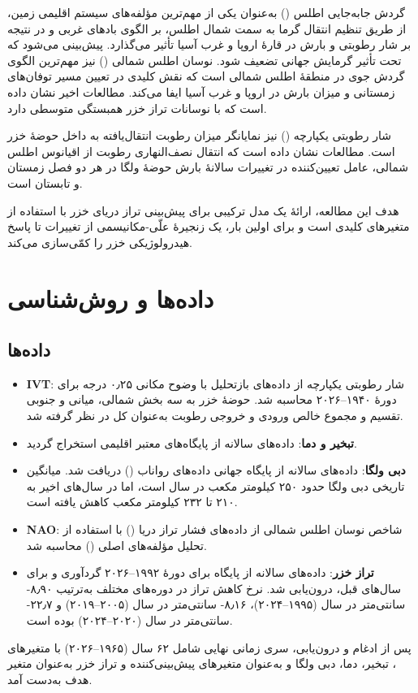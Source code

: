 \documentclass[12pt,a4paper]{article}
\begin{document}
گردش جابه‌جایی اطلس () به‌عنوان یکی از مهم‌ترین مؤلفه‌های سیستم اقلیمی زمین، از طریق تنظیم انتقال گرما به سمت شمال اطلس، بر الگوی بادهای غربی و در نتیجه بر شار رطوبتی و بارش در قارهٔ اروپا و غرب آسیا تأثیر می‌گذارد. پیش‌بینی می‌شود که  تحت تأثیر گرمایش جهانی تضعیف شود. نوسان اطلس شمالی () نیز مهم‌ترین الگوی گردش جوی در منطقهٔ اطلس شمالی است که نقش کلیدی در تعیین مسیر توفان‌های زمستانی و میزان بارش در اروپا و غرب آسیا ایفا می‌کند. مطالعات اخیر نشان داده است که  با نوسانات تراز خزر همبستگی متوسطی دارد.

شار رطوبتی یکپارچه () نیز نمایانگر میزان رطوبت انتقال‌یافته به داخل حوضهٔ خزر است. مطالعات نشان داده است که انتقال نصف‌النهاری رطوبت از اقیانوس اطلس شمالی، عامل تعیین‌کننده در تغییرات سالانهٔ بارش حوضهٔ ولگا در هر دو فصل زمستان و تابستان است.

هدف این مطالعه، ارائهٔ یک مدل ترکیبی برای پیش‌بینی تراز دریای خزر با استفاده از متغیرهای کلیدی است و برای اولین بار، یک زنجیرهٔ علّی-مکانیسمی از تغییرات  تا پاسخ هیدرولوژیکی خزر را کمّی‌سازی می‌کند.

\section{داده‌ها و روش‌شناسی}
\subsection{داده‌ها}
\begin{itemize}
\item \textbf{IVT}: شار رطوبتی یکپارچه از داده‌های بازتحلیل  با وضوح مکانی ۰٫۲۵ درجه برای دورهٔ ۱۹۴۰–۲۰۲۶ محاسبه شد. حوضهٔ خزر به سه بخش شمالی، میانی و جنوبی تقسیم و مجموع خالص ورودی و خروجی رطوبت به‌عنوان  کل در نظر گرفته شد.
\item \textbf{تبخیر و دما}: داده‌های سالانه از پایگاه‌های معتبر اقلیمی استخراج گردید.
\item \textbf{دبی ولگا}: داده‌های سالانه از پایگاه جهانی داده‌های رواناب () دریافت شد. میانگین تاریخی دبی ولگا حدود ۲۵۰ کیلومتر مکعب در سال است، اما در سال‌های اخیر به ۲۱۰ تا ۲۳۲ کیلومتر مکعب کاهش یافته است.
\item \textbf{NAO}: شاخص نوسان اطلس شمالی از داده‌های فشار تراز دریا () با استفاده از تحلیل مؤلفه‌های اصلی () محاسبه شد.
\item \textbf{تراز خزر}: داده‌های سالانه از پایگاه  برای دورهٔ ۱۹۹۲–۲۰۲۶ گردآوری و برای سال‌های قبل، درون‌یابی شد. نرخ کاهش تراز در دوره‌های مختلف به‌ترتیب ۸٫۹۰- سانتی‌متر در سال (۱۹۹۵–۲۰۲۴)، ۸٫۱۶- سانتی‌متر در سال (۲۰۰۵–۲۰۱۹) و ۲۲٫۷- سانتی‌متر در سال (۲۰۲۰–۲۰۲۴) بوده است.
\end{itemize}
پس از ادغام و درون‌یابی، سری زمانی نهایی شامل ۶۲ سال (۱۹۶۵–۲۰۲۶) با متغیرهای ، تبخیر، دما، دبی ولگا و  به‌عنوان متغیرهای پیش‌بینی‌کننده و تراز خزر به‌عنوان متغیر هدف به‌دست آمد.
\end{document}
